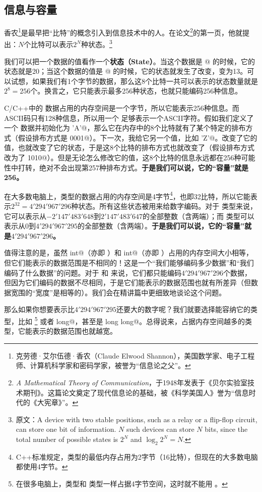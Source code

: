 \subsection*{信息与容量}
香农\footnote{克劳德·艾尔伍德·香农（Claude Elwood Shannon），美国数学家、电子工程师、计算机科学家和密码学家，被誉为``信息论之父''。}是最早把``比特''的概念引入到信息技术中的人。在论文\footnote{\textit{A Mathematical Theory of Communication}，于1948年发表于《贝尔实验室技术期刊》。这篇论文奠定了现代信息论的基础，被《科学美国人》誉为``信息时代的《大宪章》''。}的第一页，他就提出：$N$个比特可以表示$2^N$种状态。\footnote{原文：A device with two stable positions, such as a relay or a flip-flop circuit, can store one bit of information. $N$ such devices can store $N$ bits, since the total number of possible states is $2^N$ and $\log_2 2^N=N$.}\par
我们可以把一个数据的值看作一个\textbf{状态（State）}。当这个数据是 @ 的时候，它的状态就是20；当这个数据的值是 @ 的时候，它的状态就发生了改变，变为13。可以试想，如果我们有1个字节的数据，那么这8个比特一共可以表示的状态数量就是$2^8=256$个。换言之，它只能表示最多256种状态，也就只能编码256种信息。\par
C/C++中的 \lstinline@char@ 数据占用的内存空间是一个字节，所以它能表示256种信息。而ASCII码只有128种信息，所以用一个 \lstinline@char@ 足够表示一个ASCII字符。假如我们定义了一个 \lstinline@char@ 数据并初始化为 \lstinline@'A'@，那么它在内存中的8个比特就有了某个特定的排布方式（假设排布方式是  0001@）。下一次，我给它另一个值，比如 \lstinline@'Z'@。改变了它的值，也就改变了它的状态，于是这8个比特的排布方式也就改变了（假设排布方式改为了  1010@）。但是无论怎么修改它的值，这8个比特的信息永远都在256种可能性中打转，绝对不会出现第257种排布方式。\textbf{于是我们可以说，它的``容量''就是256。}\par
在大多数电脑上，\lstinline@int@ 类型的数据占用的内存空间是4字节\footnote{C++标准规定，\lstinline@int@ 类型的最低内存占用为2字节（16比特），但现在的大多数电脑都使用4字节。}，也即32比特，所以它能表示$2^{32}=4'294'967'296$种状态。所有这些状态被用来给数字编码。对于 \lstinline@int@ 类型来说，它可以表示从$−2'147'483'648$到$2'147'483'647$的全部整数（含两端）；而 \lstinline@unsigned@ 类型可以表示从$0$到$4'294'967'295$的全部整数（含两端）。\textbf{于是我们可以说，它的``容量''就是$4'294'967'296$。}\par
值得注意的是，虽然 \lstinline@signed int@（亦即 \lstinline@int@）和 \lstinline@unsigned int@（亦即 \lstinline@unsigned@）占用的内存空间大小相等，但它们能表示的数据范围是不相同的！这是一个``我们能够编码多少数据''和``我们编码了什么数据''的问题。对于 \lstinline@int@ 和 \lstinline@unsigned@ 来说，它们都只能编码$4'294'967'296$个数据，但因为它们编码的数据不尽相同，于是它们能表示的数据范围也就有所差异（但数据宽围的``宽度''是相等的）。我们会在精讲篇中更细致地谈论这个问题。\par
那么如果你想要表示比$4'294'967'295$还要大的数字呢？我们就要选择能容纳它的类型，比如 \lstinline@long@\footnote{在很多电脑上，\lstinline@long@ 类型和 \lstinline@int@ 类型一样占据4字节空间，这时就不能用 \lstinline@long@。} 或者 \lstinline@long long@，甚至是 \lstinline@unsigned long long@。总得说来，占据内存空间越多的类型，它能表示的数据范围也就越宽。\par
